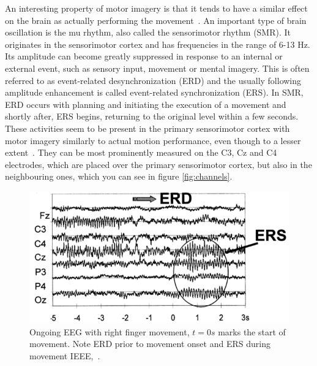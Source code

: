 \documentclass[english, he, bc, kiv, iso690alph]{fasthesis}
\begin{document}
An interesting property of motor imagery is that it tends to have a similar effect on the brain as actually performing the movement~\cite{pfurtscheller:mi:01}. An important type of brain oscillation is the mu rhythm, also called the sensorimotor rhythm (SMR). It originates in the sensorimotor cortex and has frequencies in the range of 6-13 Hz. Its amplitude can become greatly suppressed in response to an internal or external event, such as sensory input, movement or mental imagery. This is often referred to as event-related desynchronization (ERD) and the usually following amplitude enhancement is called event-related synchronization (ERS). In SMR, ERD occurs with planning and initiating the execution of a movement and shortly after, ERS begins, returning to the original level within a few seconds. These activities seem to be present in the primary sensorimotor cortex with motor imagery similarly to actual motion performance, even though to a lesser extent~\cite{pfurtscheller:mi:01}. They can be most prominently measured on the C3, Cz and C4 electrodes, which are placed over the primary sensorimotor cortex, but also in the neighbouring ones, which you can see in figure \ref{fig:channels}.

\begin{figure}[h]
	\includegraphics[width=\textwidth]{fig/erders.png}
	\caption{Ongoing EEG with right finger movement, $t=0s$ marks the start of movement. Note ERD prior to movement onset and ERS during movement  IEEE,~\cite{pfurtscheller:mi:01}.}
\end{figure}

\end{document}
